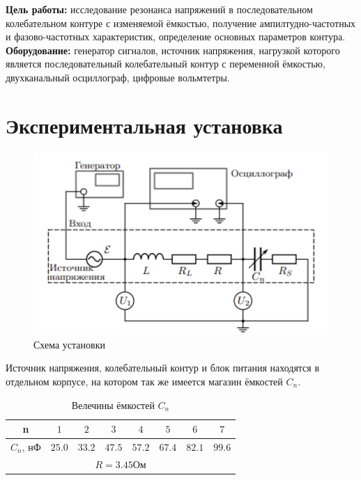 \textbf{Цель работы:}  исследование резонанса напряжений в последовательном колебательном контуре с изменяемой ёмкостью, получение ампилтудно-частотных и фазово-частотных характеристик, определение основных параметров контура. 
\\\indent\textbf{Оборудование:} генератор сигналов, источник напряжения, нагрузкой которого является последовательный колебательный контур с переменной ёмкостью, двухканальный осциллограф, цифровые вольмтетры. 
 

\section*{Экспериментальная установка}

\begin{figure}[h!]
    \centering
    \includegraphics[width=12cm]{setup.png}
    \caption{Схема установки}
\end{figure}

Источник напряжения, колебательный контур и блок питания находятся в отдельном корпусе, на котором так же имеется магазин ёмкостей $C_n$.
\begin{table}
        \centering
        \begin{tabular}{|c|c|c|c|c|c|c|c|}
            \hline
            n & $1 $& $2 $& $3 $& $4 $& $5 $& $6 $& $7$ \\\hline 
            $C_n$, нФ & $25.0$ & $33.2$ & $47.5$ & $57.2$ & $67.4$ & $82.1$ & $99.6$ \\\hline
            \multicolumn{8}{|c|}{ $R = 3.45$Ом}\\\hline
        \end{tabular}
        \caption{Велечины ёмкостей $C_n$}
\end{table}


